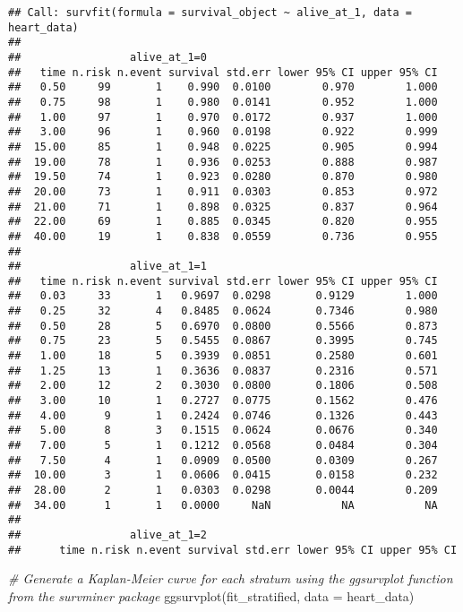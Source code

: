 \documentclass[
]{article}
\newenvironment{Shaded}{\begin{snugshade}}{\end{snugshade}}
\newcommand{\AttributeTok}[1]{\textcolor[rgb]{0.77,0.63,0.00}{#1}}
\newcommand{\CommentTok}[1]{\textcolor[rgb]{0.56,0.35,0.01}{\textit{#1}}}
\newcommand{\FunctionTok}[1]{\textcolor[rgb]{0.00,0.00,0.00}{#1}}
\newcommand{\NormalTok}[1]{#1}
\begin{document}
\begin{verbatim}
## Call: survfit(formula = survival_object ~ alive_at_1, data = heart_data)
## 
##                 alive_at_1=0 
##   time n.risk n.event survival std.err lower 95% CI upper 95% CI
##   0.50     99       1    0.990  0.0100        0.970        1.000
##   0.75     98       1    0.980  0.0141        0.952        1.000
##   1.00     97       1    0.970  0.0172        0.937        1.000
##   3.00     96       1    0.960  0.0198        0.922        0.999
##  15.00     85       1    0.948  0.0225        0.905        0.994
##  19.00     78       1    0.936  0.0253        0.888        0.987
##  19.50     74       1    0.923  0.0280        0.870        0.980
##  20.00     73       1    0.911  0.0303        0.853        0.972
##  21.00     71       1    0.898  0.0325        0.837        0.964
##  22.00     69       1    0.885  0.0345        0.820        0.955
##  40.00     19       1    0.838  0.0559        0.736        0.955
## 
##                 alive_at_1=1 
##   time n.risk n.event survival std.err lower 95% CI upper 95% CI
##   0.03     33       1   0.9697  0.0298       0.9129        1.000
##   0.25     32       4   0.8485  0.0624       0.7346        0.980
##   0.50     28       5   0.6970  0.0800       0.5566        0.873
##   0.75     23       5   0.5455  0.0867       0.3995        0.745
##   1.00     18       5   0.3939  0.0851       0.2580        0.601
##   1.25     13       1   0.3636  0.0837       0.2316        0.571
##   2.00     12       2   0.3030  0.0800       0.1806        0.508
##   3.00     10       1   0.2727  0.0775       0.1562        0.476
##   4.00      9       1   0.2424  0.0746       0.1326        0.443
##   5.00      8       3   0.1515  0.0624       0.0676        0.340
##   7.00      5       1   0.1212  0.0568       0.0484        0.304
##   7.50      4       1   0.0909  0.0500       0.0309        0.267
##  10.00      3       1   0.0606  0.0415       0.0158        0.232
##  28.00      2       1   0.0303  0.0298       0.0044        0.209
##  34.00      1       1   0.0000     NaN           NA           NA
## 
##                 alive_at_1=2 
##      time n.risk n.event survival std.err lower 95% CI upper 95% CI
\end{verbatim}

\begin{Shaded}
\begin{Highlighting}[]
\CommentTok{\# Generate a Kaplan{-}Meier curve for each stratum using the ggsurvplot function from the survminer package}
\FunctionTok{ggsurvplot}\NormalTok{(fit\_stratified, }\AttributeTok{data =}\NormalTok{ heart\_data)}
\end{Highlighting}
\end{Shaded}
\end{document}
